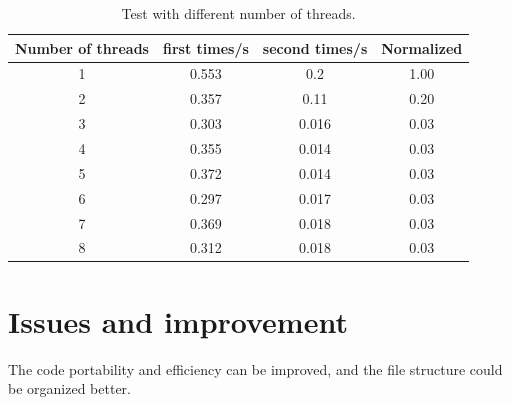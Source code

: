 \documentclass[12pt]{article}
\begin{document}
\begin{table}[ht]
    \centering
    \caption{Test with different number of threads.}
    \label{tab:test}
    \begin{tabular}{@{}cccc@{}}
        \toprule
        {\color[HTML]{000000} Number of threads} & {\color[HTML]{000000} first times/s} & second times/s & Normalized \\ \midrule
        {\color[HTML]{000000} 1}                 & {\color[HTML]{000000} 0.553}         & 0.2            & 1.00       \\
        {\color[HTML]{000000} 2}                 & {\color[HTML]{000000} 0.357}         & 0.11           & 0.20       \\
        {\color[HTML]{000000} 3}                 & {\color[HTML]{000000} 0.303}         & 0.016          & 0.03       \\
        {\color[HTML]{000000} 4}                 & {\color[HTML]{000000} 0.355}         & 0.014          & 0.03       \\
        5                                        & 0.372                                & 0.014          & 0.03       \\
        6                                        & 0.297                                & 0.017          & 0.03       \\
        7                                        & 0.369                                & 0.018          & 0.03       \\
        8                                        & 0.312                                & 0.018          & 0.03       \\ \bottomrule
        \end{tabular}
    \end{table}
\section{Issues and improvement}
The code portability and efficiency can be improved, and the file structure could be organized better.
\end{document}
